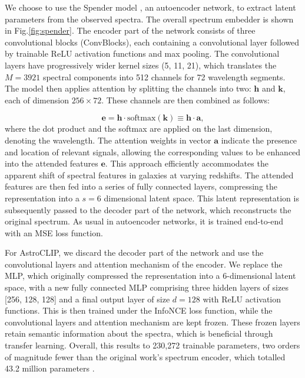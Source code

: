 \documentclass[draft, a4paper,12pt]{article}
\begin{document}
We choose to use the Spender model \cite{spender}, an autoencoder network, to extract latent parameters from the observed spectra. The overall spectrum embedder is shown in Fig.\ref{fig:spender}. The encoder part of the network consists of three convolutional blocks (ConvBlocks), each containing a convolutional layer followed by trainable ReLU activation functions and max pooling. The convolutional layers have progressively wider kernel sizes (5, 11, 21), which translates the $M=3921$ spectral components into 512 channels for 72 wavelength segments.  The model then applies attention by splitting the channels into two: $\mathbf{h}$ and $\mathbf{k}$, each of dimension $256 \times 72$. These channels are then combined as follows:


\begin{equation}
    \mathbf{e} = \mathbf{h} \cdot \text{softmax}(\mathbf{k}) \equiv \mathbf{h} \cdot \mathbf{a},
\end{equation}
where the dot product and the softmax are applied on the last dimension, denoting the wavelength. The attention weights in vector $\mathbf{a}$ indicate the presence and location of relevant signals, allowing the corresponding values to be enhanced into the attended features $\mathbf{e}$. This approach efficiently accommodates the apparent shift of spectral features in galaxies at varying redshifts. The attended features are then fed into a series of fully connected layers, compressing the representation into a $s=6$ dimensional latent space. This latent representation is subsequently passed to the decoder part of the network, which reconstructs the original spectrum. As usual in autoencoder networks, it is trained end-to-end with an MSE loss function.

For AstroCLIP, we discard the decoder part of the network and use the convolutional layers and attention mechanism of the encoder. We replace the MLP, which originally compressed the representation into a 6-dimensional latent space, with a new fully connected MLP comprising three hidden layers of sizes [256, 128, 128] and a final output layer of size $d=128$ with ReLU activation functions. This is then trained under the InfoNCE loss function, while the convolutional layers and attention mechanism are kept frozen. These frozen layers retain semantic information about the spectra, which is beneficial through transfer learning. Overall, this results to 230,272 trainable parameters, two orders of magnitude fewer than the original work's spectrum encoder, which totalled 43.2 million parameters \cite{astroclip}.
\end{document}
